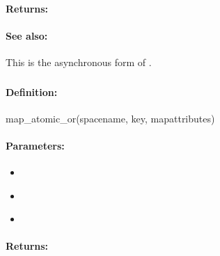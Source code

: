 \paragraph{Returns:}


\paragraph{See also:}  This is the asynchronous form of .

\pagebreak
\subsubsection{}
\label{api:ruby:map_atomic_or}


\paragraph{Definition:}
\begin{rubycode}
map_atomic_or(spacename, key, mapattributes)
\end{rubycode}

\paragraph{Parameters:}
\begin{itemize}[noitemsep]
\item {}\\

\item {}\\

\item {}\\

\end{itemize}

\paragraph{Returns:}


\pagebreak
\subsubsection{}
\label{api:ruby:async_map_atomic_or}


